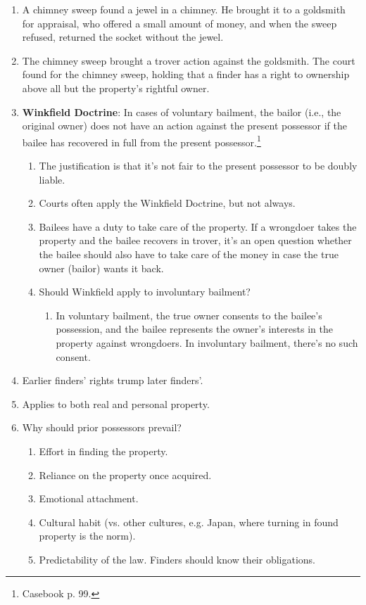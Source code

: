 \begin{enumerate}
    \item A chimney sweep found a jewel in a chimney. He brought it to a 
    goldsmith for appraisal, who offered a small amount of money, and when the 
    sweep refused, returned the socket without the jewel.
    \item The chimney sweep brought a trover action against the goldsmith. The 
    court found for the chimney sweep, holding that a finder has a right to 
    ownership above all but the property's rightful owner.
    \item \textbf{Winkfield Doctrine}: In cases of voluntary bailment, the 
    bailor (i.e., the original owner) does not have an action against the 
    present possessor if the bailee has recovered in full from the present 
    possessor.\footnote{Casebook p. 99.}
    \begin{enumerate}
        \item The justification is that it's not fair to the present 
        possessor to be doubly liable.
        \item Courts often apply the Winkfield Doctrine, but not always.
        \item Bailees have a duty to take care of the property. If a wrongdoer 
        takes the property and the bailee recovers in trover, it's an open 
        question whether the bailee should also have to take care of the money 
        in case the true owner (bailor) wants it back.
        \item Should Winkfield apply to involuntary bailment?
        \begin{enumerate}
            \item In voluntary bailment, the true owner consents to the 
            bailee's possession, and the bailee represents the owner's 
            interests in the property against wrongdoers. In involuntary 
            bailment, there's no such consent.
        \end{enumerate}
    \end{enumerate}
    \item Earlier finders' rights trump later finders'.
    \item Applies to both real and personal property.
    \item Why should prior possessors prevail?
    \begin{enumerate}
        \item Effort in finding the property.
        \item Reliance on the property once acquired.
        \item Emotional attachment.
        \item Cultural habit (vs. other cultures, e.g. Japan, where turning in 
        found property is the norm).
        \item Predictability of the law. Finders should know their 
        obligations.
    \end{enumerate}
\end{enumerate}

